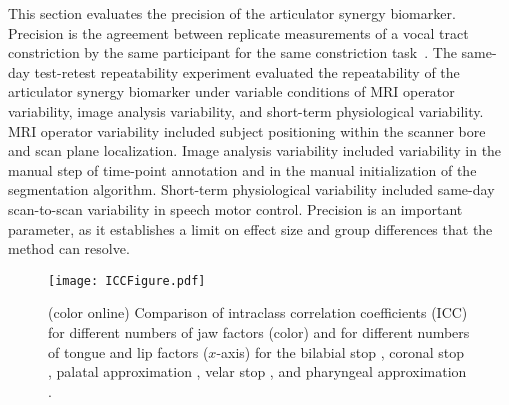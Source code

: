 \documentclass[preprint]{JASAnew}\usepackage[]{graphicx}\usepackage[]{color}
\begin{document}
This section evaluates the precision of the articulator synergy biomarker. Precision is the agreement between replicate measurements of a vocal tract constriction by the same participant for the same constriction task~\citep{kessler2015emerging,sullivan2015metrology}. 
%
The same-day test-retest repeatability experiment evaluated the repeatability of the articulator synergy biomarker under variable conditions of MRI operator variability, image analysis variability, and short-term physiological variability. 
%
MRI operator variability included subject positioning within the scanner bore and scan plane localization. 
%
Image analysis variability included variability in the manual step of time-point annotation and in the manual initialization of the segmentation algorithm. 
%
Short-term physiological variability included same-day scan-to-scan variability in speech motor control. 
%
Precision is an important parameter, as it establishes a limit on effect size and group differences that the method can resolve.

\begin{figure*}[t]
\raggedright
\texttt{[image: ICCFigure.pdf]}

\caption{(color online) Comparison of intraclass correlation coefficients (ICC) for different numbers of jaw factors (color) and for different numbers of tongue and lip factors ($x$-axis) for the bilabial stop \textipa{[p]}, coronal stop \textipa{[t]}, palatal approximation \textipa{[i]}, velar stop \textipa{[k]}, and pharyngeal approximation \textipa{[A]}.}
\label{fig:icc_all}

\end{figure*}
\end{document}
